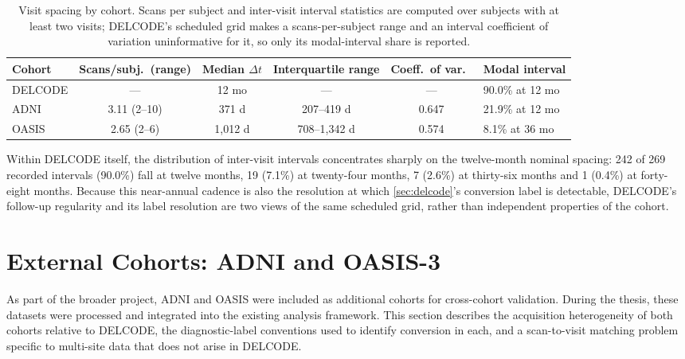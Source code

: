 \begin{table}[htbp]
  \centering
  \small
  \caption{Visit spacing by cohort. Scans per subject and inter-visit interval statistics
  are computed over subjects with at least two visits; \ac{DELCODE}'s scheduled grid makes
  a scans-per-subject range and an interval coefficient of variation uninformative for it,
  so only its modal-interval share is reported.}
  \label{tab:interval-structure}
  \begin{tabular*}{\textwidth}{@{\extracolsep{\fill}}lccccl@{}}
    \toprule
    Cohort & Scans/subj.\ (range) & Median $\Delta t$ & Interquartile range & Coeff.\ of var.\ & Modal interval \\
    \midrule
    \ac{DELCODE} & --- & 12 mo & --- & --- & 90.0\% at 12 mo \\
    \ac{ADNI} & 3.11 (2--10) & 371 d & 207--419 d & 0.647 & 21.9\% at 12 mo \\
    \ac{OASIS} & 2.65 (2--6) & 1{,}012 d & 708--1{,}342 d & 0.574 & 8.1\% at 36 mo \\
    \bottomrule
  \end{tabular*}
\end{table}

Within \ac{DELCODE} itself, the distribution of inter-visit intervals concentrates sharply
on the twelve-month nominal spacing: 242 of 269 recorded intervals (90.0\%) fall at twelve
months, 19 (7.1\%) at twenty-four months, 7 (2.6\%) at thirty-six months and 1 (0.4\%) at
forty-eight months. Because this near-annual cadence is also the resolution at which
\autoref{sec:delcode}'s conversion label is detectable, \ac{DELCODE}'s follow-up regularity
and its label resolution are two views of the same scheduled grid, rather than independent
properties of the cohort.

\section{External Cohorts: ADNI and OASIS-3}\label{sec:external-cohorts}

As part of the broader project, \ac{ADNI} and \ac{OASIS} were included as additional
cohorts for cross-cohort validation. During the thesis, these datasets were processed and
integrated into the existing analysis framework. This section describes the acquisition
heterogeneity of both cohorts relative to \ac{DELCODE}, the diagnostic-label conventions
used to identify conversion in each, and a scan-to-visit matching problem specific to
multi-site data that does not arise in \ac{DELCODE}.

